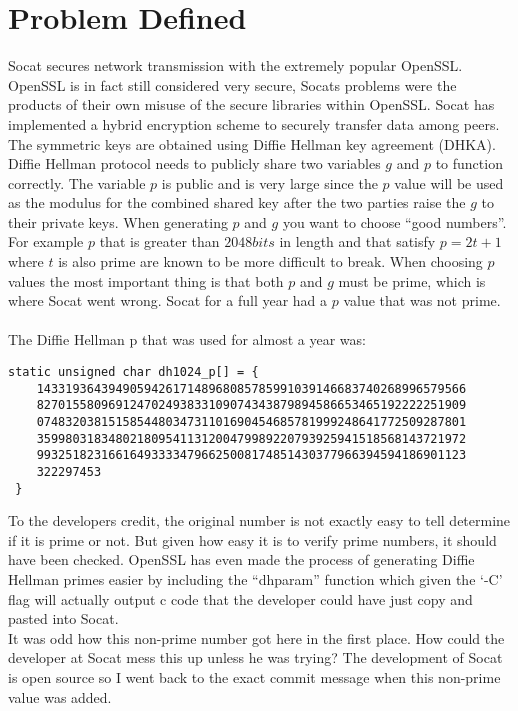 \documentclass[letterpaper,11pt,notitlepage,fleqn]{article}
\begin{document}
\section{Problem Defined}
\indent Socat secures network transmission with the extremely popular OpenSSL. OpenSSL is in fact still considered very secure, Socats problems were the products of their own misuse of the secure libraries within OpenSSL. Socat has implemented a hybrid encryption scheme to securely transfer data among peers. The symmetric keys are obtained using Diffie Hellman key agreement (DHKA).
\\
\indent Diffie Hellman protocol needs to publicly share two variables $g$ and $p$ to function correctly. The variable $p$ is public and is very large since the $p$ value will be used as the modulus for the combined shared key after the two parties raise the $g$ to their private keys. When generating $p$ and $g$ you want to choose ``good numbers''. For example $p$ that is greater than $2048bits$ in length and that satisfy $p = 2t+1$ where $t$ is also prime are known to be more difficult to break.
When choosing $p$ values the most important thing is that both $p$ and $g$ must be prime, which is where Socat went wrong. Socat for a full year had a $p$ value that was not prime.
\\
\\
The Diffie Hellman p that was used for almost a year was:
\begin{lstlisting}
static unsigned char dh1024_p[] = {
	143319364394905942617148968085785991039146683740268996579566
	827015580969124702493833109074343879894586653465192222251909
	074832038151585448034731101690454685781999248641772509287801
	359980318348021809541131200479989220793925941518568143721972
	993251823166164933334796625008174851430377966394594186901123
	322297453
 }
\end{lstlisting}
\indent To the developers credit, the original number is not exactly easy to tell determine if it is prime or not. But given how easy it is to verify prime numbers, it should have been checked. OpenSSL has even made the process of generating Diffie Hellman primes easier by including the “dhparam” function which given the ‘-C’ flag will actually output c code that the developer could have just copy and pasted into Socat.
\\
\indent It was odd how this non-prime number got here in the first place. How could the developer at Socat mess this up unless he was trying? The development of Socat is open source so I went back to the exact commit message when this non-prime value was added.
\end{document}
